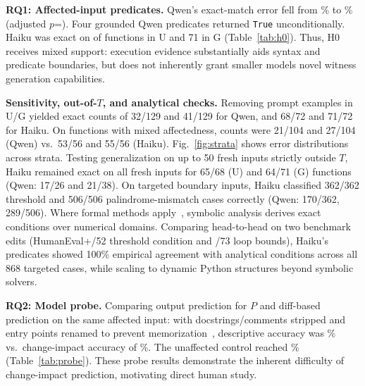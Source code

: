 \textbf{RQ1: Affected-input predicates.} Qwen's exact-match error fell from \PPredGenExactA\% to \PPredGenExactB\% (adjusted $p$=\SPredGenExactPHolm). Four grounded Qwen predicates returned \texttt{True} unconditionally. Haiku was exact on \SPredStrongUExactN{} of \SPredStrongN{} functions in U and 71 in G (Table~\ref{tab:h0}). Thus, H0 receives mixed support: execution evidence substantially aids syntax and predicate boundaries, but does not inherently grant smaller models novel witness generation capabilities.

\textbf{Sensitivity, out-of-$T$, and analytical checks.} Removing prompt examples in U/G yielded exact counts of 32/129 and 41/129 for Qwen, and 68/72 and 71/72 for Haiku. On functions with mixed affectedness, counts were 21/104 and 27/104 (Qwen) vs.\ 53/56 and 55/56 (Haiku). Fig.~\ref{fig:strata} shows error distributions across strata.
Testing generalization on up to 50 fresh inputs strictly outside $T$, Haiku remained exact on all fresh inputs for 65/68 (U) and 64/71 (G) functions (Qwen: 17/26 and 21/38). On targeted boundary inputs, Haiku classified 362/362 threshold and 506/506 palindrome-mismatch cases correctly (Qwen: 170/362, 289/506).
Where formal methods apply~\cite{sarker2026impact,person2008dse}, symbolic analysis derives exact conditions over numerical domains. Comparing head-to-head on two benchmark edits (HumanEval+/52 threshold condition and /73 loop bounds), Haiku's predicates showed 100\% empirical agreement with analytical conditions across all 868 targeted cases, while scaling to dynamic Python structures beyond symbolic solvers.



\textbf{RQ2: Model probe.} Comparing output prediction for $P$ and diff-based prediction on the same affected input: with docstrings/comments stripped and entry points renamed to prevent memorization~\cite{yang2025reversion,lam2025codecrash}, descriptive accuracy was \PProbePonefoursDESC\% vs.\ change-impact accuracy of \PProbePonefoursCF\%. The unaffected control reached \PzProbePonefoursCFCTRL\% (Table~\ref{tab:probe}). These probe results demonstrate the inherent difficulty of change-impact prediction, motivating direct human study.



